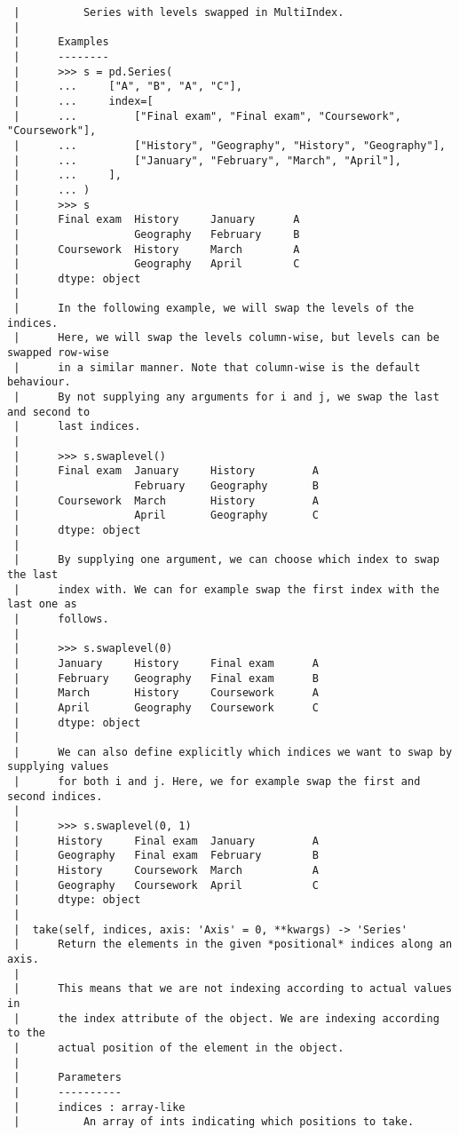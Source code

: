 \documentclass[
  letterpaper,
  DIV=11,
  numbers=noendperiod]{scrreprt}
\begin{document}
\begin{verbatim}
 |          Series with levels swapped in MultiIndex.
 |      
 |      Examples
 |      --------
 |      >>> s = pd.Series(
 |      ...     ["A", "B", "A", "C"],
 |      ...     index=[
 |      ...         ["Final exam", "Final exam", "Coursework", "Coursework"],
 |      ...         ["History", "Geography", "History", "Geography"],
 |      ...         ["January", "February", "March", "April"],
 |      ...     ],
 |      ... )
 |      >>> s
 |      Final exam  History     January      A
 |                  Geography   February     B
 |      Coursework  History     March        A
 |                  Geography   April        C
 |      dtype: object
 |      
 |      In the following example, we will swap the levels of the indices.
 |      Here, we will swap the levels column-wise, but levels can be swapped row-wise
 |      in a similar manner. Note that column-wise is the default behaviour.
 |      By not supplying any arguments for i and j, we swap the last and second to
 |      last indices.
 |      
 |      >>> s.swaplevel()
 |      Final exam  January     History         A
 |                  February    Geography       B
 |      Coursework  March       History         A
 |                  April       Geography       C
 |      dtype: object
 |      
 |      By supplying one argument, we can choose which index to swap the last
 |      index with. We can for example swap the first index with the last one as
 |      follows.
 |      
 |      >>> s.swaplevel(0)
 |      January     History     Final exam      A
 |      February    Geography   Final exam      B
 |      March       History     Coursework      A
 |      April       Geography   Coursework      C
 |      dtype: object
 |      
 |      We can also define explicitly which indices we want to swap by supplying values
 |      for both i and j. Here, we for example swap the first and second indices.
 |      
 |      >>> s.swaplevel(0, 1)
 |      History     Final exam  January         A
 |      Geography   Final exam  February        B
 |      History     Coursework  March           A
 |      Geography   Coursework  April           C
 |      dtype: object
 |  
 |  take(self, indices, axis: 'Axis' = 0, **kwargs) -> 'Series'
 |      Return the elements in the given *positional* indices along an axis.
 |      
 |      This means that we are not indexing according to actual values in
 |      the index attribute of the object. We are indexing according to the
 |      actual position of the element in the object.
 |      
 |      Parameters
 |      ----------
 |      indices : array-like
 |          An array of ints indicating which positions to take.

\end{verbatim}
\end{document}

